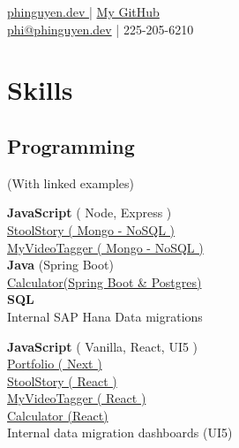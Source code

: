 \documentclass[]{deedy-resume-openfont}
\begin{document}
%
%
\lastupdated

%
%
{ \href{https://phinguyen.dev}{phinguyen.dev }| \href{https://github.com/pnguy55}{ My GitHub}\\
\href{mailto:phi@phinguyen.dev}{phi@phinguyen.dev} | 225-205-6210
}

%
%

\begin{minipage}[t]{0.33\textwidth} 


\section{Skills}
\subsection{Programming}
(With linked examples)
\vspace{\topsep} %

{\bf JavaScript} ( Node, Express )\\
\textbullet{} \href{https://stoolstory.com}{ StoolStory ( Mongo - NoSQL )}\\
\textbullet{} \href{https://myvideotagger.com}{ MyVideoTagger ( Mongo - NoSQL )}\\

{\bf Java} (Spring Boot)\\
\textbullet{} \href{https://calculator-react-spring.herokuapp.com/}{ Calculator(Spring Boot & Postgres)}\\
{\bf SQL} \\
\textbullet{} Internal SAP Hana Data migrations\\

\vspace{\topsep} %

{\bf JavaScript} ( Vanilla, React, UI5 )\\
\textbullet{} \href{https://phinguyen.dev}{ Portfolio ( Next )}\\
\textbullet{} \href{https://stoolstory.com}{ StoolStory ( React )}\\
\textbullet{} \href{https://myvideotagger.com}{ MyVideoTagger ( React )}\\
\textbullet{} \href{https://calculator-react-spring.herokuapp.com/}{ Calculator (React)}\\
\textbullet{} Internal data migration dashboards (UI5)


\end{minipage}
\end{document}
